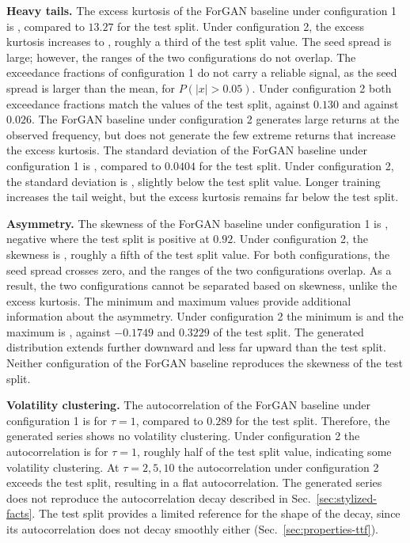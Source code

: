 \textbf{Heavy tails.} The excess kurtosis of the ForGAN baseline under configuration 1 is , compared to $13.27$ for the test split. Under configuration 2, the excess kurtosis increases to , roughly a third of the test split value. The seed spread is large; however, the ranges of the two configurations do not overlap.
The exceedance fractions of configuration 1 do not carry a reliable signal, as the seed spread is larger than the mean,  for $P(|x| > 0.05)$. Under configuration 2 both exceedance fractions match the values of the test split,  against $0.130$ and  against $0.026$. The ForGAN baseline under configuration 2 generates large returns at the observed frequency, but does not generate the few extreme returns that increase the excess kurtosis. 
The standard deviation of the ForGAN baseline under configuration 1 is , compared to $0.0404$ for the test split. Under configuration 2, the standard deviation is , slightly below the test split value.
Longer training increases the tail weight, but the excess kurtosis remains far below the test split. 

\textbf{Asymmetry.} The skewness of the ForGAN baseline under configuration 1 is , negative where the test split is positive at $0.92$. Under configuration 2, the skewness is , roughly a fifth of the test split value. For both configurations, the seed spread crosses zero, and the ranges of the two configurations overlap. As a result, the two configurations cannot be separated based on skewness, unlike the excess kurtosis.
The minimum and maximum values provide additional information about the asymmetry. Under configuration 2 the minimum is  and the maximum is , against $-0.1749$ and $0.3229$ of the test split. The generated distribution extends further downward and less far upward than the test split. Neither configuration of the ForGAN baseline reproduces the skewness of the test split. 

\textbf{Volatility clustering.} The autocorrelation of the ForGAN baseline under configuration 1 is  for $\tau=1$, compared to $0.289$ for the test split. Therefore, the generated series shows no volatility clustering. Under configuration 2 the autocorrelation is  for $\tau=1$, roughly half of the test split value, indicating some volatility clustering. At $\tau=2, 5, 10$ the autocorrelation under configuration 2 exceeds the test split, resulting in a flat autocorrelation. The generated series does not reproduce the autocorrelation decay described in Sec.~\ref{sec:stylized-facts}. The test split provides a limited reference for the shape of the decay, since its autocorrelation does not decay smoothly either (Sec.~\ref{sec:properties-ttf}).

